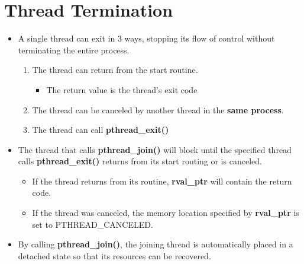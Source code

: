 \documentclass{article}
\begin{document}
\clearpage
\section{Thread Termination}
\begin{itemize}
    \item A single thread can exit in 3 ways, stopping its flow of control without terminating the entire process.
        \begin{enumerate}
            \item The thread can return from the start routine.
                \begin{itemize}
                    \item The return value is the thread's exit code
                \end{itemize}
            \item The thread can be canceled by another thread in the \textbf{same process}.
            \item The thread can call \textbf{pthread\_exit()}
        \end{enumerate}


    \item The thread that calls \textbf{pthread\_join()} will block until the specified thread calls \textbf{pthread\_exit()} returns from its start routing or is canceled.
\begin{itemize}
    \item If the thread returns from its routine, \textbf{rval\_ptr} will contain the return code.
    \item If the thread was canceled, the memory location specified by \textbf{rval\_ptr} is set to PTHREAD\_CANCELED.
\end{itemize}

\item By calling \textbf{pthread\_join()}, the joining thread is automatically placed in a detached state so that its resources can be recovered.
\end{itemize}
\end{document}
